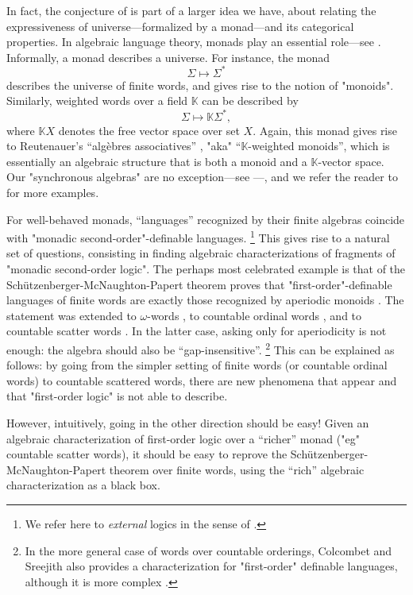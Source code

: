 In fact, the conjecture of 
is part of a larger idea we have, about relating the expressiveness of
universe---formalized by a monad---and its categorical properties. 
In algebraic language theory, monads play an essential role---see .
Informally, a monad describes a universe.
For instance, the monad
\[
	\Sigma \mapsto \Sigma^*
\]
describes the universe of finite words, and gives rise to the notion of
"monoids". Similarly, weighted words over a field $\mathbb{K}$ can be described by
\[
	\Sigma \mapsto \mathbb{K}\Sigma^*,
\]
where $\mathbb{K}X$ denotes the free vector space over set $X$.
Again, this monad gives rise to Reutenauer's ``algèbres associatives''
\cite{Reutenauer1980SeriesFormelles}, "aka" ``$\mathbb{K}$-weighted monoids'',
which is essentially an algebraic structure that is both a monoid and a
$\mathbb{K}$-vector space.
Our "synchronous algebras" are no exception---see ---,
and we refer the reader to \cite[\S~4]{Bojanczyk2020MSO} for more examples.

For well-behaved monads, ``languages'' recognized by their finite algebras
coincide with "monadic second-order"-definable languages.%
\footnote{We refer here to \emph{external} logics in the sense of
.}
This gives rise to a natural set of questions, consisting
in finding algebraic characterizations
of fragments of "monadic second-order logic".
The perhaps most celebrated example is that of
the Schützenberger-McNaughton-Papert theorem
proves that "first-order"-definable languages of finite words
are exactly those recognized by aperiodic monoids
\cite{Schutzenberger1965FiniteMonoidsAperiodic,McNaughtonPapert1971CounterFreeAutomata}.
The statement was extended to $\omega$-words \cite{Perrin1984Recent},
to countable ordinal words \cite{Bedon2001Logic},
and to countable scatter words \cite{BesCarton2011AlgebraicFO}.
In the latter case, asking only for aperiodicity is not enough:
the algebra should also be ``gap-insensitive''.%
\footnote{In the more general case of words over countable orderings,
Colcombet and Sreejith also provides a characterization for "first-order"
definable languages, although it is more complex \cite{ColcombetSreejith2015Limited}.}
This can be explained as follows: by going from the simpler setting
of finite words (or countable ordinal words) to countable scattered words,
there are new phenomena that appear and that "first-order logic" is 
not able to describe.

However, intuitively, going in the other direction should be easy!
Given an algebraic characterization of first-order logic over a ``richer'' monad
("eg" countable scatter words), it should be easy to reprove the
Schützenberger-McNaughton-Papert theorem over finite words, using the
``rich'' algebraic characterization as a black box.

